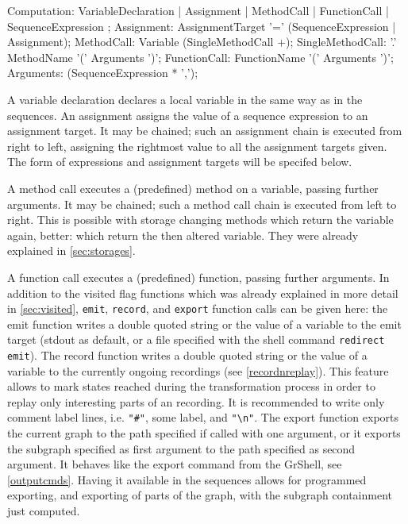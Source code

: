 \begin{rail} 
  Computation:
     VariableDeclaration |
     Assignment |
     MethodCall |
     FunctionCall |
     SequenceExpression
  ;
	Assignment:	AssignmentTarget '=' (SequenceExpression | Assignment); 
	MethodCall: Variable (SingleMethodCall +);
	SingleMethodCall: '.' MethodName '(' Arguments ')';
	FunctionCall: FunctionName '(' Arguments ')';
	Arguments: (SequenceExpression * ',');
\end{rail}\label{recstmt}

A variable declaration declares a local variable in the same way as in the sequences.
An assignment assigns the value of a sequence expression to an assignment target.
It may be chained; such an assignment chain is executed from right to left, assigning the rightmost value to all the assignment targets given.
The form of expressions and assignment targets will be specifed below.

A method call executes a (predefined) method on a variable, passing further arguments.
It may be chained; such a method call chain is executed from left to right. 
This is possible with storage changing methods which return the variable again, better: which return the then altered variable. 
They were already explained in \ref{sec:storages}.

A function call executes a (predefined) function, passing further arguments.
In addition to the visited flag functions which was already explained in more detail in \ref{sec:visited},
\texttt{emit}, \texttt{record}, and \texttt{export} function calls can be given here: the emit function writes a double quoted string or the value of a variable to the emit target (stdout as default, or a file specified with the shell command \texttt{redirect emit}).
The record function writes a double quoted string or the value of a variable to the currently ongoing recordings (see \ref{recordnreplay}). This feature allows to mark states reached during the transformation process in order to replay only interesting parts of an recording. It is recommended to write only comment label lines, i.e. \verb/"#"/, some label, and \verb/"\n"/.
The export function exports the current graph to the path specified if called with one argument, or it exports the subgraph specified as first argument to the path specified as second argument.
It behaves like the export command from the GrShell, see \ref{outputcmds}.
Having it available in the sequences allows for programmed exporting, and exporting of parts of the graph, with the subgraph containment just computed.

